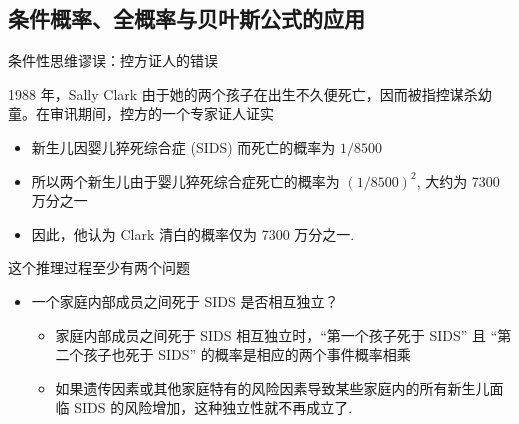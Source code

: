\documentclass[Prob-All.tex]{subfiles}
\begin{document}
\subsection{条件概率、全概率与贝叶斯公式的应用}
\begin{frame}{条件性思维谬误：控方证人的错误}
\begin{exam} 1988 年，Sally Clark 由于她的两个孩子在出生不久便死亡，因而被指控谋杀幼童。在审讯期间，控方的一个专家证人证实
\begin{itemize}[<+-|alert@+>]
\item 新生儿因婴儿猝死综合症 (SIDS) 而死亡的概率为 $1/8500$
\item 所以两个新生儿由于婴儿猝死综合症死亡的概率为 $(1/8500)^2$, 大约为 7300 万分之一
\item 因此，他认为 Clark 清白的概率仅为 7300 万分之一.
\end{itemize}
\end{exam}
\vspace{0.2cm}

\pause
\begin{jieda} 这个推理过程至少有两个问题
\begin{itemize}[<+-|alert@+>]
\item 一个家庭内部成员之间死于 SIDS 是否相互独立？
\begin{itemize}[<+-|alert@+>]
\item 家庭内部成员之间死于 SIDS 相互独立时，“第一个孩子死于 SIDS” 且 “第二个孩子也死于 SIDS” 的概率是相应的两个事件概率相乘
\item 如果遗传因素或其他家庭特有的风险因素导致某些家庭内的所有新生儿面临 SIDS 的风险增加，这种独立性就不再成立了.
\end{itemize}
\end{itemize}
\end{jieda}
\end{frame}
\end{document}
